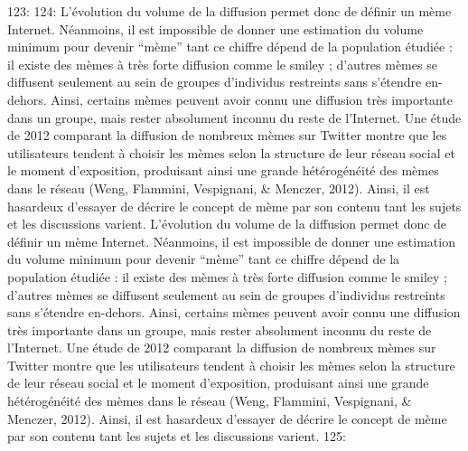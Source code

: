 123: 
124: L{\textquoteright}\'evolution du volume de la diffusion permet donc de d\'efinir un m\`eme Internet. N\'eanmoins, il est impossible de donner une estimation du volume minimum pour devenir {\textquotedblleft}m\`eme{\textquotedblright} tant ce chiffre d\'epend de la population \'etudi\'ee : il existe des m\`emes \`a tr\`es forte diffusion comme le smiley ; d{\textquoteright}autres m\`emes se diffusent seulement au sein de groupes d{\textquoteright}individus restreints sans s{\textquoteright}\'etendre en-dehors. Ainsi, certains m\`emes peuvent avoir connu une diffusion tr\`es importante dans un groupe, mais rester absolument inconnu du reste de l{\textquoteright}Internet. Une \'etude de 2012 comparant la diffusion de nombreux m\`emes sur Twitter montre que les utilisateurs tendent \`a choisir les m\`emes selon la structure de leur r\'eseau social et le moment d{\textquoteright}exposition, produisant ainsi une grande h\'et\'erog\'en\'eit\'e des m\`emes dans le r\'eseau (Weng, Flammini, Vespignani, \& Menczer, 2012). Ainsi, il est hasardeux d{\textquoteright}essayer de d\'ecrire le concept de m\`eme par son contenu tant les sujets et les discussions varient. 
L{\textquoteright}\'evolution du volume de la diffusion permet donc de d\'efinir un m\`eme Internet. N\'eanmoins, il est impossible de donner une estimation du volume minimum pour devenir {\textquotedblleft}m\`eme{\textquotedblright} tant ce chiffre d\'epend de la population \'etudi\'ee : il existe des m\`emes \`a tr\`es forte diffusion comme le smiley ; d{\textquoteright}autres m\`emes se diffusent seulement au sein de groupes d{\textquoteright}individus restreints sans s{\textquoteright}\'etendre en-dehors. Ainsi, certains m\`emes peuvent avoir connu une diffusion tr\`es importante dans un groupe, mais rester absolument inconnu du reste de l{\textquoteright}Internet. Une \'etude de 2012 comparant la diffusion de nombreux m\`emes sur Twitter montre que les utilisateurs tendent \`a choisir les m\`emes selon la structure de leur r\'eseau social et le moment d{\textquoteright}exposition, produisant ainsi une grande h\'et\'erog\'en\'eit\'e des m\`emes dans le r\'eseau (Weng, Flammini, Vespignani, \& Menczer, 2012). Ainsi, il est hasardeux d{\textquoteright}essayer de d\'ecrire le concept de m\`eme par son contenu tant les sujets et les discussions varient. 
125: 
